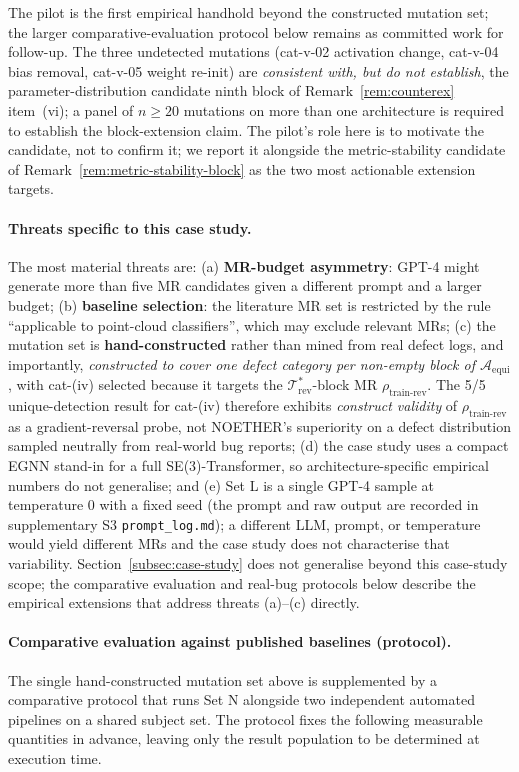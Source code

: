 \documentclass[manuscript]{acmart}
\begin{document}
The pilot is the first empirical handhold beyond the constructed mutation set; the larger comparative-evaluation protocol below remains as committed work for follow-up. The three undetected mutations (cat-v-02 activation change, cat-v-04 bias removal, cat-v-05 weight re-init) are \emph{consistent with, but do not establish}, the parameter-distribution candidate ninth block of Remark~\ref{rem:counterex} item~(vi); a panel of $n \ge 20$ mutations on more than one architecture is required to establish the block-extension claim. The pilot's role here is to motivate the candidate, not to confirm it; we report it alongside the metric-stability candidate of Remark~\ref{rem:metric-stability-block} as the two most actionable extension targets.

\paragraph{Threats specific to this case study.}
The most material threats are: (a) \textbf{MR-budget asymmetry}: GPT-4 might generate more than five MR candidates given a different prompt and a larger budget; (b) \textbf{baseline selection}: the literature MR set is restricted by the rule ``applicable to point-cloud classifiers'', which may exclude relevant MRs; (c) the mutation set is \textbf{hand-constructed} rather than mined from real defect logs, and importantly, \emph{constructed to cover one defect category per non-empty block of $\mathcal{A}_{\mathrm{equi}}$}, with cat-(iv) selected because it targets the $\mathcal{T}^{*}_{\mathrm{rev}}$-block MR $\rho_{\mathrm{train\text{-}rev}}$. The 5/5 unique-detection result for cat-(iv) therefore exhibits \emph{construct validity} of $\rho_{\mathrm{train\text{-}rev}}$ as a gradient-reversal probe, not NOETHER's superiority on a defect distribution sampled neutrally from real-world bug reports; (d) the case study uses a compact EGNN stand-in for a full SE(3)-Transformer, so architecture-specific empirical numbers do not generalise; and (e) Set L is a single GPT-4 sample at temperature 0 with a fixed seed (the prompt and raw output are recorded in supplementary S3 \texttt{prompt\_log.md}); a different LLM, prompt, or temperature would yield different MRs and the case study does not characterise that variability. Section~\ref{subsec:case-study} does not generalise beyond this case-study scope; the comparative evaluation and real-bug protocols below describe the empirical extensions that address threats (a)--(c) directly.

\paragraph{Comparative evaluation against published baselines (protocol).}
\label{para:comp-eval-protocol}
The single hand-constructed mutation set above is supplemented by a comparative protocol that runs Set N alongside two independent automated pipelines on a shared subject set. The protocol fixes the following measurable quantities in advance, leaving only the result population to be determined at execution time.
\end{document}
